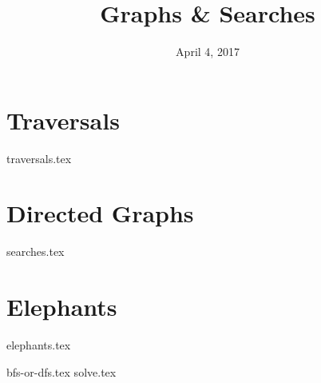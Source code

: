 \documentclass[11pt]{exam}
\title{Graphs \& Searches}
\date{April 4, 2017}
\begin{document}
\maketitle

\section{Traversals}
\begin{questions}
{traversals.tex}
\end{questions}

\section{Directed Graphs}
\begin{questions}
{searches.tex}
\end{questions}

\clearpage

\section{Elephants}
{elephants.tex}
\begin{questions}
{bfs-or-dfs.tex}
{solve.tex}
\end{questions}
\end{document}
